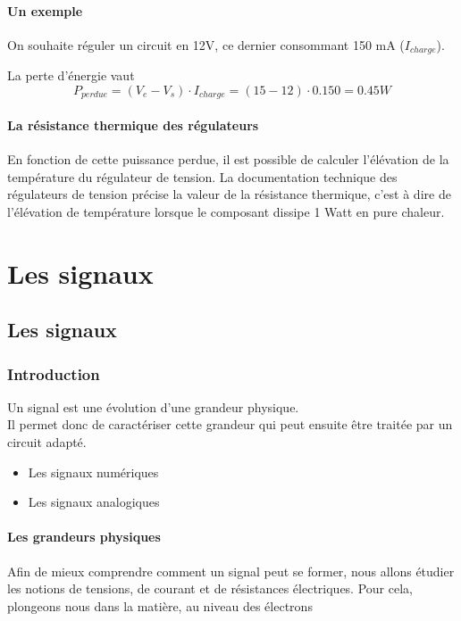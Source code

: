   \subsection{Un exemple}

  On souhaite réguler un circuit en 12V, ce dernier consommant 150 mA ($I_{charge}$).

  La perte d'énergie vaut $$ P_{perdue} =(V_e-V_s)\cdot I_{charge} =(15-12)\cdot 0.150 = 0.45 W$$

  \subsection{La résistance thermique  des régulateurs}
  En fonction de cette puissance perdue, il est possible de calculer l’élévation de la température du régulateur de tension.
  La documentation technique des régulateurs de tension précise la valeur de la résistance thermique, c'est à dire de l'élévation de température lorsque le composant dissipe 1 Watt en pure chaleur.%
\part{Les signaux}
\chapter{Les signaux}

\section{Introduction}

Un signal est une évolution d'une grandeur physique.\\
Il permet donc de caractériser cette grandeur qui peut ensuite être traitée par un circuit adapté.


\begin{itemize}
    \item Les signaux numériques
    \item Les signaux analogiques
\end{itemize} 

\subsection{Les grandeurs physiques}

Afin de mieux comprendre comment un signal peut se former, nous allons étudier les notions de tensions, 
de courant et de résistances électriques.
Pour cela, plongeons nous dans la matière, au niveau des électrons

